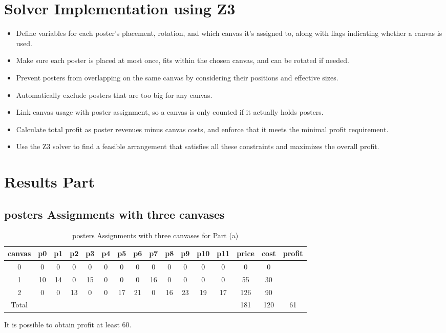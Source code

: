 \documentclass{article}
\begin{document}
\section{Solver Implementation using Z3}

\begin{itemize}
\item Define variables for each poster’s placement, rotation, and which canvas it’s assigned to, along with flags indicating whether a canvas is used.
\item Make sure each poster is placed at most once, fits within the chosen canvas, and can be rotated if needed.
\item Prevent posters from overlapping on the same canvas by considering their positions and effective sizes.
\item Automatically exclude posters that are too big for any canvas.
\item Link canvas usage with poster assignment, so a canvas is only counted if it actually holds posters.
\item Calculate total profit as poster revenues minus canvas costs, and enforce that it meets the minimal profit requirement.
\item Use the Z3 solver to find a feasible arrangement that satisfies all these constraints and maximizes the overall profit.
\end{itemize}

\section{Results Part}

\subsection{posters Assignments with three canvases}

\begin{table}[H]
\centering
\caption{posters Assignments with three canvases for Part (a)}
\small
\begin{tabular}{c|cccccccccccc|c|c|c}
\toprule
canvas & p0 & p1 & p2 & p3 & p4  & p5 & p6 & p7 & p8 & p9 & p10 & p11 & price & cost & profit\\
\midrule
0 & 0 & 0 & 0 & 0 & 0 & 0 & 0 & 0 & 0 & 0 & 0 & 0 & 0 & 0 &\\
1 & 10 & 14 & 0 & 15 & 0 & 0 & 0 & 16 & 0 & 0 & 0 & 0 & 55 & 30 &\\
2 & 0 & 0 & 13 & 0 & 0 & 17 & 21 & 0 & 16 & 23 & 19 & 17 & 126 & 90 &\\
\midrule
Total & & & & & & & & & & & & & 181 & 120 & 61\\
\bottomrule
\end{tabular}
\end{table}
It is possible to obtain profit at least 60.
\end{document}
